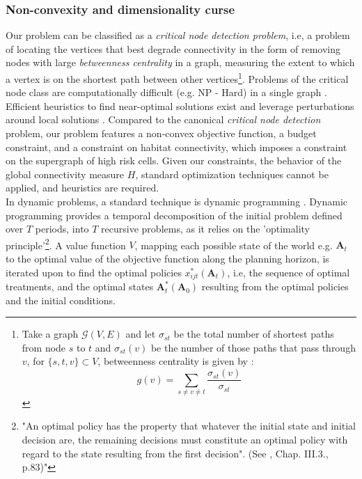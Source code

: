 \subsubsection{Non-convexity and dimensionality curse}
Our problem can be classified as a \textit{critical node detection problem}, i.e, a problem of locating the vertices that best degrade connectivity in the form of removing  nodes with large \textit{betweenness centrality} in a graph, measuring the extent to which a vertex is on the shortest path between other vertices\footnote{Take a graph $\mathcal{G}(V,E)$ and let $\sigma_{st}$ be the total number of shortest paths from node $s$ to $t$ and $\sigma_{st}(v)$ be the number of those paths that pass through $v$, for $\{s,t,v\} \subset V$, betweenness centrality is given by :
$$
g(v) = \sum_{s\neq v \neq t} \frac{\sigma_{st}(v)}{\sigma_{st}}
$$
}\citep{ARULSELVAN20092193}. Problems of the critical node class are computationally difficult (e.g. NP - Hard) in a single graph \citep{ARULSELVAN20092193, matsypura_wildfire_2018}. Efficient heuristics to find near-optimal solutions exist and leverage perturbations around local solutions \citep{ARULSELVAN20092193, Zhou2017}. Compared to the canonical \textit{critical node detection} problem, our problem features a non-convex objective function, a budget constraint, and a constraint on habitat connectivity, which imposes a constraint on the supergraph of high risk cells. Given our constraints, the behavior of the global connectivity measure $H$, standard optimization techniques cannot be applied, and heuristics are required. \\
In dynamic problems, a standard technique is dynamic programming \citep{Bellman}. Dynamic programming provides a temporal decomposition of the initial problem defined over $T$ periods, into $T$ recursive problems, as it relies on the 'optimality principle'\footnote{"An optimal policy has the property that whatever the initial state and initial decision are, the remaining decisions must constitute an optimal policy with regard to the state resulting from the first decision". (See \cite{Bellman}, Chap. III.3., p.83)"}. A value function $V$, mapping each possible state of the world e.g. $\mathbf{A}_t$ to the optimal value of the objective function along the planning horizon, is iterated upon to find the optimal policies $x_{ijt}^*(\mathbf{A}_t)$, i.e, the sequence of optimal treatments, and the optimal states $\mathbf{A}_t^*(\mathbf{A}_0)$ resulting from the optimal policies and the initial conditions.
